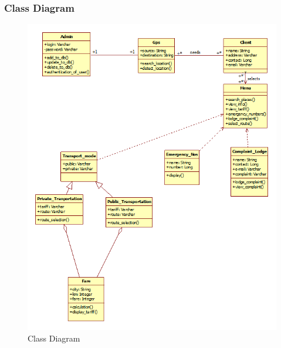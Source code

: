 \documentclass[12pt,a4paper]{article}
\begin{document}
{{{{{{\subsubsection{Class Diagram}
\begin{figure}[!htb]
\centering
\includegraphics[width=15 cm]{class}
\caption{Class Diagram}
\end{figure}
\newpage
}}}}}}
\end{document}
